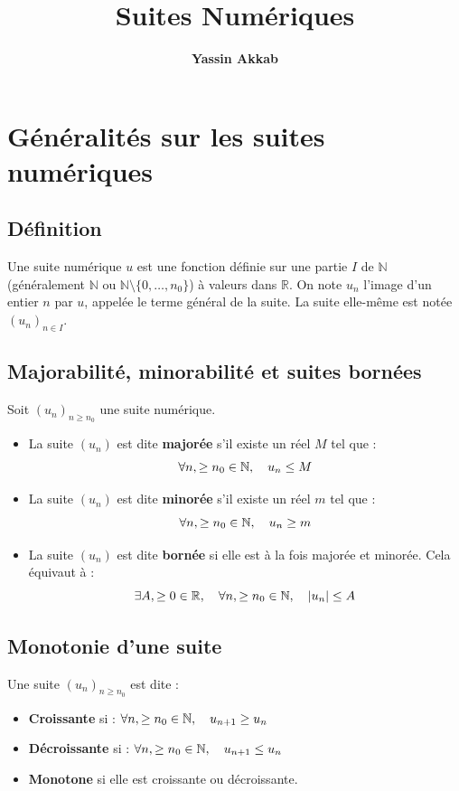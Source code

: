 \documentclass{article}
\title{\textbf{Suites Numériques}}
\author{\textbf{Yassin Akkab}}
\begin{document}
	
	\maketitle
	\tableofcontents
	\newpage
	
	\section{Généralités sur les suites numériques}
	
	\subsection{Définition}
	Une suite numérique $u$ est une fonction définie sur une partie $I$ de $\mathbb{N}$ (généralement $\mathbb{N}$ ou $\mathbb{N} \setminus \{0, \dots, n_0\}$) à valeurs dans $\mathbb{R}$.
	On note $u_n$ l'image d'un entier $n$ par $u$, appelée le terme général de la suite. La suite elle-même est notée $(u_n)_{n \in I}$.
	
	\subsection{Majorabilité, minorabilité et suites bornées}
	Soit $(u_n)_{n \ge n_0}$ une suite numérique.
	\begin{itemize}
		\item La suite $(u_n)$ est dite \textbf{majorée} s'il existe un réel $M$ tel que :
		\[ \qcq{n}[\ge n_0]{N}, \quad u_n \le M \]
		\item La suite $(u_n)$ est dite \textbf{minorée} s'il existe un réel $m$ tel que :
		\[ \qcq{n}[\ge n_0]{N}, \quad u_n \ge m \]
		\item La suite $(u_n)$ est dite \textbf{bornée} si elle est à la fois majorée et minorée. Cela équivaut à :
		\[ \ext{A}[\ge 0]{R}, \quad \qcq{n}[\ge n_0]{N}, \quad |u_n| \le A \]
	\end{itemize}
	
	\subsection{Monotonie d'une suite}
	Une suite $(u_n)_{n \ge n_0}$ est dite :
	\begin{itemize}
		\item \textbf{Croissante} si : $\qcq{n}[\ge n_0]{N}, \quad u_{n+1} \ge u_n$
		\item \textbf{Décroissante} si : $\qcq{n}[\ge n_0]{N}, \quad u_{n+1} \le u_n$
		\item \textbf{Monotone} si elle est croissante ou décroissante.
	\end{itemize}
	
\end{document}

